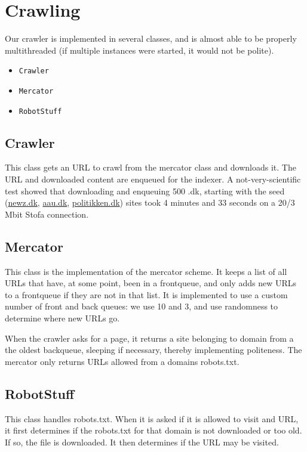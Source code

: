 \section{Crawling}
Our crawler is implemented in several classes, and is almost able to be properly multithreaded (if multiple instances were started, it would not be polite).
\begin{itemize}
	\item \texttt{Crawler}
	\item \texttt{Mercator}
	\item \texttt{RobotStuff}
\end{itemize}

\subsection{Crawler}
This class gets an URL to crawl from the mercator class and downloads it. The URL and downloaded content are enqueued for the indexer. A not-very-scientific test showed that downloading and enqueuing 500 .dk, starting with the seed (\url{newz.dk}, \url{aau.dk}, \url{politikken.dk}) sites took 4 minutes and 33 seconds on a 20/3 Mbit Stofa connection.

\subsection{Mercator}
This class is the implementation of the mercator scheme. It keeps a list of all URLs that have, at some point, been in a frontqueue, and only adds new URLs to a frontqueue if they are not in that list. It is implemented to use a custom number of front and back queues: we use 10 and 3, and use randomness to determine where new URLs go.

When the crawler asks for a page, it returns a site belonging to domain from a the oldest backqueue, sleeping if necessary, thereby implementing politeness. The mercator only returns URLs allowed from a domains robots.txt.

\subsection{RobotStuff}
This class handles robots.txt. When it is asked if it is allowed to visit and URL, it first determines if the robots.txt for that domain is not downloaded or too old. If so, the file is downloaded. It then determines if the URL may be visited.